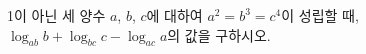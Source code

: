 1이 아닌 세 양수 $a$, $b$, $c$에 대하여 $a^2=b^3=c^4$이 성립할 때, $\log_{ab} b+\log_{bc} c-\log_{ac} a$의 값을 구하시오.

